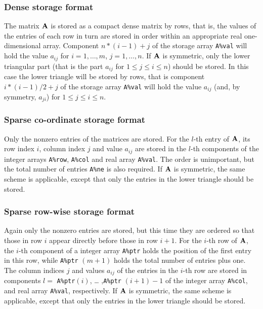 \documentclass{galahad}
\begin{document}
\subsubsection{Dense storage format}\label{dense}
The matrix ${\mathbf{A}}$ is stored as a compact 
dense matrix by rows, that is, the values of the entries of each row in turn are
stored in order within an appropriate real one-dimensional array.
Component $n \ast (i-1) + j$ of the storage array {\tt A\%val} will hold the 
value $a_{ij}$ for $i = 1, \ldots , m$, $j = 1, \ldots , n$.
If ${\mathbf{A}}$ is symmetric, only the lower triangular part (that is the part 
$a_{ij}$ for $1 \leq j \leq i \leq n$) should be stored.  In this case
the lower triangle will be stored by rows, that is 
component $i \ast (i-1)/2 + j$ of the storage array {\tt A\%val}  
will hold the value $a_{ij}$ (and, by symmetry, $a_{ji}$)
for $1 \leq j \leq i \leq n$.

\subsubsection{Sparse co-ordinate storage format}\label{coordinate}
Only the nonzero entries of the matrices are stored. For the $l$-th
entry of ${\mathbf{A}}$, its row index $i$, column index $j$ and value
$a_{ij}$ are stored in the $l$-th components of the integer arrays
{\tt A\%row}, {\tt A\%col} and real array {\tt A\%val}.  The order is
unimportant, but the total number of entries {\tt A\%ne} is also
required.  If ${\mathbf{A}}$ is symmetric, the same scheme is applicable,
except that only the entries in the lower triangle should be stored.

\subsubsection{Sparse row-wise storage format}\label{rowwise}
Again only the nonzero entries are stored, but this time they are
ordered so that those in row $i$ appear directly before those in row
$i+1$. For the $i$-th row of ${\mathbf{A}}$, the $i$-th component of a integer
array {\tt A\%ptr} holds the position of the first entry in this row,
while {\tt A\%ptr} $(m+1)$ holds the total number of entries plus one.
The column indices $j$ and values $a_{ij}$ of the entries in the
$i$-th row are stored in components $l =$ {\tt A\%ptr}$(i)$, \ldots
,{\tt A\%ptr} $(i+1)-1$ of the integer array {\tt A\%col}, and real
array {\tt A\%val}, respectively.  If ${\mathbf{A}}$ is symmetric, the same
scheme is applicable, except that only the entries in the lower
triangle should be stored.
\end{document}
